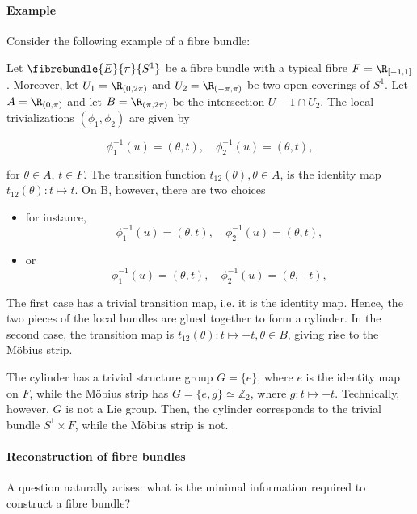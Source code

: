 \paragraph{Example}

Consider the following example of a fibre bundle: \medbreak

Let $\fibrebundle{E}{\pi}{S^1}$ be a fibre bundle with a typical fibre $F = \R_{[-1, 1]}$. Moreover, let $U_1 = \R_{(0, 2\pi)}$ and $U_2 = \R_{(-\pi, \pi)}$ be two 
open coverings of $S^1$. 
Let $A = \R_{(0, \pi)}$ and let $B = \R_{(\pi, 2\pi)}$ be the intersection $U-1 \cap U_2$. 
The local trivializations $(\phi_1, \phi_2)$ are given by 

\[
    \phi_1^{-1}(u) = (\theta, t), \quad \phi_2^{-1}(u) = (\theta, t),
\]

for $\theta \in A$, $t \in F$. The transition function $t_{12}(\theta), \theta \in A$, is the identity map $t_{12}(\theta): t \mapsto t$. 
On B, however, there are two choices

\begin{itemize}
    \item for instance, \[
        \phi_1^{-1}(u) = (\theta, t), \quad \phi_2^{-1}(u) = (\theta, t),
        \]
    \item or \[
        \phi_1^{-1}(u) = (\theta, t), \quad \phi_2^{-1}(u) = (\theta, -t),
    \]
\end{itemize}

The first case has a trivial transition map, i.e. it is the identity map. Hence, the two pieces of the local bundles are glued together to form a cylinder.
In the second case, the transition map is $t_{12}(\theta): t \mapsto -t, \theta \in B$, giving rise to the M\"obius strip. \medbreak

The cylinder has a trivial structure group $G = \{e\}$, where $e$ is the identity map on $F$, while the M\"obius strip has $G = \{e,g\} \simeq \mathds{Z}_2$, where $g: t \mapsto -t$. Technically, however, $G$ is not a Lie group. Then, the cylinder corresponds to the trivial bundle $S^1 \times F$, while the M\"obius strip is not. \medbreak

\paragraph{Reconstruction of fibre bundles}

A question naturally arises: what is the minimal information required to construct a fibre bundle? 

